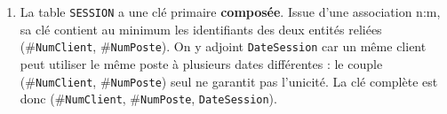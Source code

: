 \documentclass[11pt]{article}
\begin{document}
\begin{corrige}
\begin{enumerate}
  \begin{itemize}
    \item \texttt{CLIENT} (\underline{\texttt{NumClient}}, \texttt{Nom}, \texttt{Telephone}) ;
    \item \texttt{TARIF} (\underline{\texttt{CodeTarif}}, \texttt{Libelle}, \texttt{PrixHeure}) ;
    \item \texttt{POSTE} (\underline{\texttt{NumPoste}}, \texttt{Marque}, \#\texttt{CodeTarif}) — la clé de \texttt{TARIF} (côté 1) migre dans \texttt{POSTE} (côté n) ;
    \item \texttt{SESSION} (\underline{\#\texttt{NumClient}}, \underline{\#\texttt{NumPoste}}, \underline{\texttt{DateSession}}, \texttt{Duree}).
  \end{itemize}
  \item La table \texttt{SESSION} a une clé primaire \textbf{composée}. Issue d'une association n:m, sa clé contient au minimum les identifiants des deux entités reliées (\#\texttt{NumClient}, \#\texttt{NumPoste}). On y adjoint \texttt{DateSession} car un même client peut utiliser le même poste à plusieurs dates différentes : le couple (\#\texttt{NumClient}, \#\texttt{NumPoste}) seul ne garantit pas l'unicité. La clé complète est donc (\#\texttt{NumClient}, \#\texttt{NumPoste}, \texttt{DateSession}).
\end{enumerate}
\end{corrige}
\end{document}
